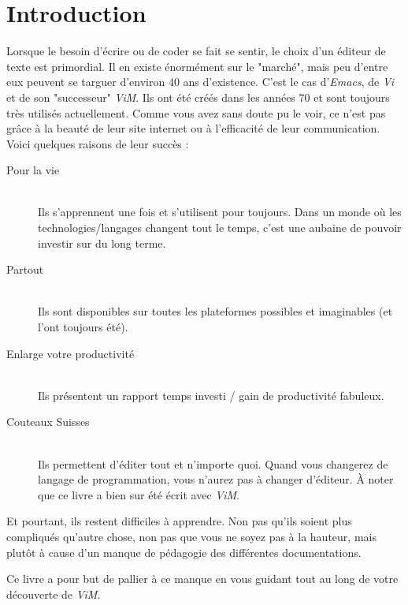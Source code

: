 \chapter*{Introduction}

Lorsque le besoin d'écrire ou de coder se fait se sentir, le choix d'un éditeur de texte est primordial. Il en existe énormément sur le "marché", mais peu d'entre eux peuvent se targuer d'environ 40 ans d'existence. C'est le cas d'\emph{Emacs}, de \emph{Vi} et de son "successeur" \emph{ViM}. Ils ont été créés dans les années 70 et sont toujours très utilisés actuellement. Comme vous avez sans doute pu le voir, ce n'est pas grâce à la beauté de leur site internet ou à l'efficacité de leur communication. Voici quelques raisons de leur succès :

\begin{description}
    \item[Pour la vie] \hfill \\ Ils s'apprennent une fois et s'utilisent pour toujours. Dans un monde où les technologies/langages changent tout le temps, c'est une aubaine de pouvoir investir sur du long terme.
    \item[Partout] \hfill \\ Ils sont disponibles sur toutes les plateformes possibles et imaginables (et l'ont toujours été).
    \item[Enlarge votre productivité] \hfill \\ Ils présentent un rapport temps investi / gain de productivité fabuleux.
    \item[Couteaux Suisses] \hfill \\ Ils permettent d'éditer tout et n'importe quoi. Quand vous changerez de langage de programmation, vous n'aurez pas à changer d'éditeur. À noter que ce livre a bien sur été écrit avec \emph{ViM}.
\end{description}

Et pourtant, ils restent difficiles à apprendre. Non pas qu'ils soient plus compliqués qu'autre chose, non pas que vous ne soyez pas à la hauteur, mais plutôt à cause d'un manque de pédagogie des différentes documentations.

Ce livre a pour but de pallier à ce manque en vous guidant tout au long de votre découverte de \emph{ViM}.

